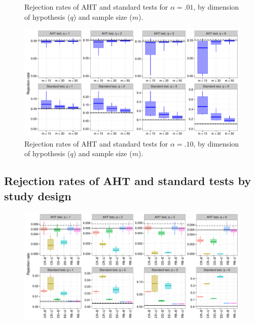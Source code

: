 \documentclass{article}\usepackage[]{graphicx}\usepackage[]{color}
\newenvironment{knitrout}{}{} %
\begin{document}
\begin{landscape}
\begin{knitrout}
\begin{figure}[H]
{}

\caption[Rejection rates of AHT and standard tests for ]{Rejection rates of AHT and standard tests for $\alpha = .01$, by dimension of hypothesis ($q$) and sample size ($m$).}\label{fig:overview_01}
\end{figure}


\end{knitrout}

\begin{knitrout}
\color{fgcolor}\begin{figure}[H]

{\centering \includegraphics[width=\linewidth]{CR_fig/overview_10-1} 

}

\caption[Rejection rates of AHT and standard tests for ]{Rejection rates of AHT and standard tests for $\alpha = .10$, by dimension of hypothesis ($q$) and sample size ($m$).}\label{fig:overview_10}
\end{figure}


\end{knitrout}

\newpage
\subsection{Rejection rates of AHT and standard tests by study design}

\begin{knitrout}
\color{fgcolor}\begin{figure}[H]

{\centering \includegraphics[width=\linewidth]{CR_fig/balance_005_15-1} 

}
\end{figure}
\end{knitrout}
\end{landscape}
\end{document}
